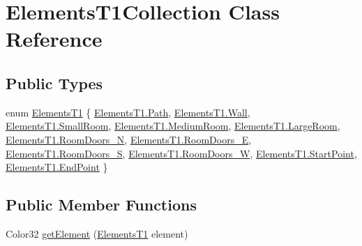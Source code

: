 \hypertarget{class_elements_t1_collection}{}\section{Elements\+T1\+Collection Class Reference}
\label{class_elements_t1_collection}
\subsection*{Public Types}
\begin{DoxyCompactItemize}
\item 
enum \mbox{\hyperlink{class_elements_t1_collection_aec399e621c99ecb08e2e39fa299057e9}{Elements\+T1}} \{ \newline
\mbox{\hyperlink{class_elements_t1_collection_aec399e621c99ecb08e2e39fa299057e9aac70412e939d72a9234cdebb1af5867b}{Elements\+T1.\+Path}}, 
\mbox{\hyperlink{class_elements_t1_collection_aec399e621c99ecb08e2e39fa299057e9a94e8a499539d1a472f3b5dbbb85508c0}{Elements\+T1.\+Wall}}, 
\mbox{\hyperlink{class_elements_t1_collection_aec399e621c99ecb08e2e39fa299057e9acd68964dbf235503c14f646a0a6c4b87}{Elements\+T1.\+Small\+Room}}, 
\mbox{\hyperlink{class_elements_t1_collection_aec399e621c99ecb08e2e39fa299057e9a2f555f317c44016c5f32c9de1b3af560}{Elements\+T1.\+Medium\+Room}}, 
\newline
\mbox{\hyperlink{class_elements_t1_collection_aec399e621c99ecb08e2e39fa299057e9a5851fc55016139bf1e5c4b968aa9df4c}{Elements\+T1.\+Large\+Room}}, 
\mbox{\hyperlink{class_elements_t1_collection_aec399e621c99ecb08e2e39fa299057e9a149fb31e15b0061afde7c67e772b0399}{Elements\+T1.\+Room\+Doors\+\_\+N}}, 
\mbox{\hyperlink{class_elements_t1_collection_aec399e621c99ecb08e2e39fa299057e9a8f0cbbf543f7f5b820bcb86bc8caa356}{Elements\+T1.\+Room\+Doors\+\_\+E}}, 
\mbox{\hyperlink{class_elements_t1_collection_aec399e621c99ecb08e2e39fa299057e9a5aebfd417a0c3a5806130a12e7c5b2ff}{Elements\+T1.\+Room\+Doors\+\_\+S}}, 
\newline
\mbox{\hyperlink{class_elements_t1_collection_aec399e621c99ecb08e2e39fa299057e9a38e9e43001b86659b6fc67e91a3268e5}{Elements\+T1.\+Room\+Doors\+\_\+W}}, 
\mbox{\hyperlink{class_elements_t1_collection_aec399e621c99ecb08e2e39fa299057e9a66ebb760a5bef13b69ceac0feb004d2a}{Elements\+T1.\+Start\+Point}}, 
\mbox{\hyperlink{class_elements_t1_collection_aec399e621c99ecb08e2e39fa299057e9ab7ae24ea48e61624a7e4078daa60bd78}{Elements\+T1.\+End\+Point}}
 \}
\end{DoxyCompactItemize}
\subsection*{Public Member Functions}
\begin{DoxyCompactItemize}
\item 
Color32 \mbox{\hyperlink{class_elements_t1_collection_a0ed14a425093b4638af05104311d951d}{get\+Element}} (\mbox{\hyperlink{class_elements_t1_collection_aec399e621c99ecb08e2e39fa299057e9}{Elements\+T1}} element)
\end{DoxyCompactItemize}


